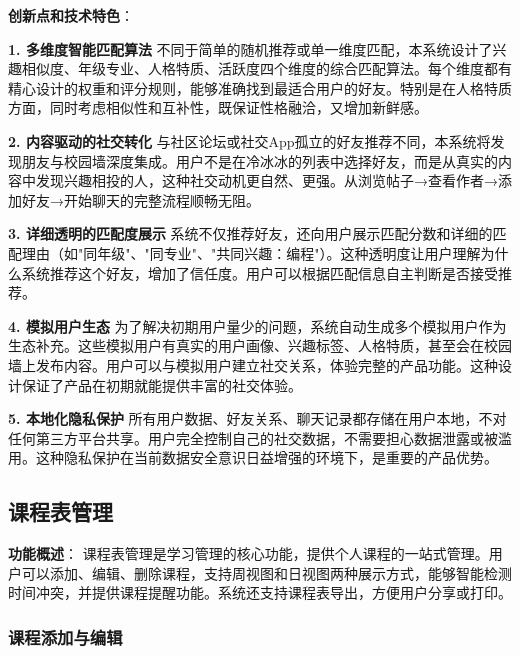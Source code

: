 \documentclass[12pt,a4paper]{article}
\begin{document}
\textbf{创新点和技术特色}：

\textbf{1. 多维度智能匹配算法}
不同于简单的随机推荐或单一维度匹配，本系统设计了兴趣相似度、年级专业、人格特质、活跃度四个维度的综合匹配算法。每个维度都有精心设计的权重和评分规则，能够准确找到最适合用户的好友。特别是在人格特质方面，同时考虑相似性和互补性，既保证性格融洽，又增加新鲜感。

\textbf{2. 内容驱动的社交转化}
与社区论坛或社交App孤立的好友推荐不同，本系统将发现朋友与校园墙深度集成。用户不是在冷冰冰的列表中选择好友，而是从真实的内容中发现兴趣相投的人，这种社交动机更自然、更强。从浏览帖子→查看作者→添加好友→开始聊天的完整流程顺畅无阻。

\textbf{3. 详细透明的匹配度展示}
系统不仅推荐好友，还向用户展示匹配分数和详细的匹配理由（如"同年级"、"同专业"、"共同兴趣：编程"）。这种透明度让用户理解为什么系统推荐这个好友，增加了信任度。用户可以根据匹配信息自主判断是否接受推荐。

\textbf{4. 模拟用户生态}
为了解决初期用户量少的问题，系统自动生成多个模拟用户作为生态补充。这些模拟用户有真实的用户画像、兴趣标签、人格特质，甚至会在校园墙上发布内容。用户可以与模拟用户建立社交关系，体验完整的产品功能。这种设计保证了产品在初期就能提供丰富的社交体验。

\textbf{5. 本地化隐私保护}
所有用户数据、好友关系、聊天记录都存储在用户本地，不对任何第三方平台共享。用户完全控制自己的社交数据，不需要担心数据泄露或被滥用。这种隐私保护在当前数据安全意识日益增强的环境下，是重要的产品优势。

\subsection{课程表管理}

\textbf{功能概述}：
课程表管理是学习管理的核心功能，提供个人课程的一站式管理。用户可以添加、编辑、删除课程，支持周视图和日视图两种展示方式，能够智能检测时间冲突，并提供课程提醒功能。系统还支持课程表导出，方便用户分享或打印。

\subsubsection{课程添加与编辑}
\end{document}
